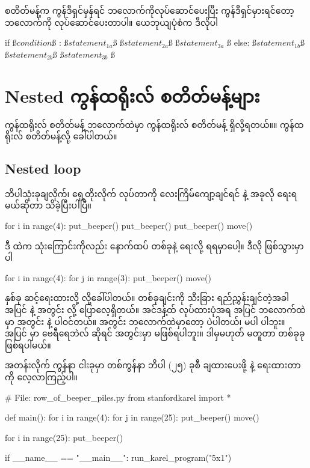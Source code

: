  စတိတ်မန့်က ကွန်ဒီရှင်မှန်ရင်   ဘလောက်ကိုလုပ်ဆောင်ပေးပြီး ကွန်ဒီရှင်မှားရင်တော့  ဘလောက်ကို လုပ်ဆောင်ပေးတာပါ။ ယေဘုယျပုံစံက ဒီလိုပါ
%
\begin{py}
if ß$condition$ß :
    ß$statement_{1a}$ß
    ß$statement_{2a}$ß
    ß$statement_{3a}$ ß
else:
    ß$statement_{1b}$ß
    ß$statement_{2b}$ß
    ß$statement_{3b}$ ß
\end{py}
%

\section{Nested ကွန်ထရိုးလ် စတိတ်မန့်များ}
ကွန်ထရိုးလ် စတိတ်မန့် ဘလောက်ထဲမှာ ကွန်ထရိုးလ် စတိတ်မန့် ရှိလို့ရတယ်။။  ကွန်ထရိုးလ် စတိတ်မန့်လို့ ခေါ်ပါတယ်။ 

\subsection*{Nested  loop}
%
ဘိပါသုံးခုချလိုက်၊ ရှေ့တိုးလိုက် လုပ်တာကို လေးကြိမ်ကျော့ချင်ရင်   နဲ့ အခုလို ရေးရမယ်ဆိုတာ သိခဲ့ပြီးပါပြီ။
%
\begin{py}
for i in range(4):
    put_beeper()
    put_beeper()
    put_beeper()
    move()
\end{py}
%
ဒီ   ထဲက  သုံးကြောင်းကိုလည်း နောက်ထပ်  တစ်ခုနဲ့ ရေးလို့ ရရမှာပေါ့။ ဒီလို ဖြစ်သွားမှာပါ
%
\begin{py}
for i in range(4):
    for j in range(3):
        put_beeper()
    move()
\end{py}
%
  နှစ်ခု ဆင့်ရေးထားလို့    လို့ခေါ်ပါတယ်။   တစ်ခုချင်းကို သီးခြား ရည်ညွှန်းချင်တဲ့အခါ အပြင်   နဲ့ အတွင်း   လို့ ပြောလေ့ရှိတယ်။ အင်ဒန့်ထ် လုပ်ထားပုံအရ အပြင်   ဘလောက်ထဲမှာ အတွင်း   နဲ့  ပါဝင်တယ်။ အတွင်း   ဘလောက်ထဲမှာတော့  ပဲပါတယ်၊  မပါ ပါဘူး။ အပြင်   မှာ ဗေရီရေဘဲလ်  ဆိုရင် အတွင်းမှာ  မဖြစ်ရပါဘူး။ \fEn{,} ဒါမှမဟုတ်  မတူတာ  တစ်ခုခုဖြစ်ရပါမယ်။ 


အတန်းလိုက် ကွန်နာ ငါးခုမှာ တစ်ကွန်နာ ဘိပါ (၂၅) ခုစီ ချထားပေးဖို့   နဲ့ ရေးထားတာကို လေ့လာကြည့်ပါ။
%
\begin{py}
# File: row_of_beeper_piles.py
from stanfordkarel import *


def main():
    for i in range(4):
        for j in range(25):
            put_beeper()
        move()

    for i in range(25):
        put_beeper()


if __name__ == "__main__":
    run_karel_program("5x1")
\end{py}
%

